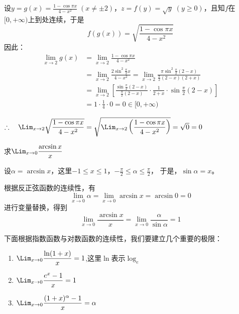\begin{solution}
设$y=g(x)=\frac{1-\cos\pi x}{4-x^2}\; (x\ne \pm 2)$，$z=f(y)=\sqrt{y}\; (y\ge 0)$，且知$f$在$[0,+\infty)$上到处连续，于是
\[f(g(x))=\sqrt{\frac{1-\cos\pi x}{4-x^2}}\]
因此：
\[\begin{split}
    \lim_{x\to 2}g(x)&=\lim_{x\to 2}\frac{1-\cos \pi x}{4-x^2}\\
    &=\lim_{x\to 2}\frac{2\sin^2\frac{\pi}{2}x}{4-x^2}=\lim_{x\to 2}\frac{\pi\sin^2\frac{\pi}{2}(2-x)}{\frac{\pi}{2}(2-x)(2+x)}\\
    &=\lim_{x\to 2}\left[\frac{\sin\frac{\pi}{2}(2-x)}{\frac{\pi}{2}(2-x)}\cdot \frac{1}{2+x}\cdot \sin\frac{\pi}{2}(2-x)  \right]\\
    &=1\cdot \frac{1}{4}\cdot 0=0\in [0,+\infty)
\end{split}\]

$\therefore\quad \Lim_{x\to 2}\sqrt{\frac{1-\cos\pi x}{4-x^2}}=\sqrt{\Lim_{x\to 2}\left(\frac{1-\cos\pi x}{4-x^2}\right)}=\sqrt{0}=0$
\end{solution}

\begin{example}
    求$\Lim_{x\to 0}\frac{\arcsin x}{x}$
\end{example}

\begin{solution}
设$\alpha=\arcsin x$，这里$-1\le x\le 1$，$-\frac{\pi}{2}\le\alpha\le \frac{\pi}{2}$，
于是，$\sin\alpha=x$。

根据反正弦函数的连续性，有
\[\lim_{x\to 0} \alpha=\lim_{x\to 0}\arcsin x=\arcsin 0=0\]
进行变量替换，得到
\[\lim_{x\to 0} \frac{\arcsin x}{x}=\lim_{x\to 0}\frac{\alpha}{\sin\alpha}=1\]
\end{solution}

下面根据指数函数与对数函数的连续性，我们要建立几个重要的极限：
\begin{enumerate}
    \item $\Lim_{x\to 0} \frac{\ln(1+x)}{x}=1$,\quad 这里$\ln$表示$\log_e$
    \item $\Lim_{x\to 0}\frac{e^x-1}{x}=1$
    \item $\Lim_{x\to 0}\frac{(1+x)^\alpha -1}{x}=\alpha$
\end{enumerate}

